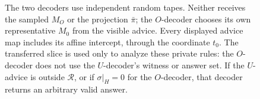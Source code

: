 \begin{figure}[htbp]
\caption{The two decoders use independent random tapes. Neither receives the
sampled $M_O$ or the projection $\bar\pi$; the $O$-decoder chooses its own
representative $M_0$ from the visible advice. Every displayed advice map
includes its affine intercept, through the coordinate $t_0$. The
transferred slice is used only to analyze these private rules: the
$O$-decoder does not use the $U$-decoder's witness or answer set. If the
$U$-advice is outside $\mathcal R$, or if $\sigma|_H=0$ for the $O$-decoder, that
decoder returns an arbitrary valid answer.}
\label{fig:advice}
\end{figure}
